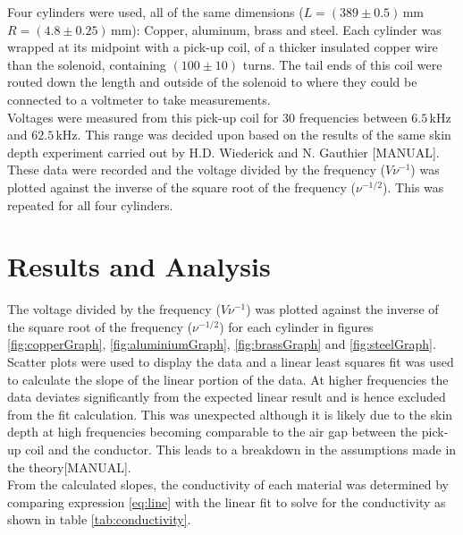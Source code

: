 \documentclass[a4paper,12pt,twocolumn]{article}
\begin{document}
	Four cylinders were used, all of the same dimensions ($L = (389 \pm 0.5)\,\text{mm}$ $R = (4.8 \pm 0.25)\,\text{mm}$): Copper, aluminum, brass and steel. Each cylinder was wrapped at its midpoint with a pick-up coil, of a thicker insulated copper wire than the solenoid, containing $(100 \pm 10)$ turns. The tail ends of this coil were routed down the length and outside of the solenoid to where they could be connected to a voltmeter to take measurements.\\
	
	Voltages were measured from this pick-up coil for 30 frequencies between $6.5 \,\text{kHz}$ and $62.5 \,\text{kHz}$. This range was decided upon based on the results of the same skin depth experiment carried out by H.D. Wiederick and N. Gauthier [MANUAL]. These data were recorded and the voltage divided by the frequency ($V \nu^{-1}$) was plotted against the inverse of the square root of the frequency ($\nu ^{-1/2}$). This was repeated for all four cylinders.
	
\section{Results and Analysis}
	
	The voltage divided by the frequency ($V \nu^{-1}$) was plotted against the inverse of the square root of the frequency ($\nu ^{-1/2}$) for each cylinder in figures \ref{fig:copperGraph}, \ref{fig:aluminiumGraph}, \ref{fig:brassGraph} and \ref{fig:steelGraph}. Scatter plots were used to display the data and a linear least squares fit was used to calculate the slope of the linear portion of the data. At higher frequencies the data deviates significantly from the expected linear result and is hence excluded from the fit calculation. This was unexpected although it is likely due to the skin depth at high frequencies becoming comparable to the air gap between the pick-up coil and the conductor. This leads to a breakdown in the assumptions made in the theory[MANUAL].\\
	
	From the calculated slopes, the conductivity of each material was determined by comparing expression \ref{eq:line} with the linear fit to solve for the conductivity as shown in table \ref{tab:conductivity}.\\
	
\end{document}
